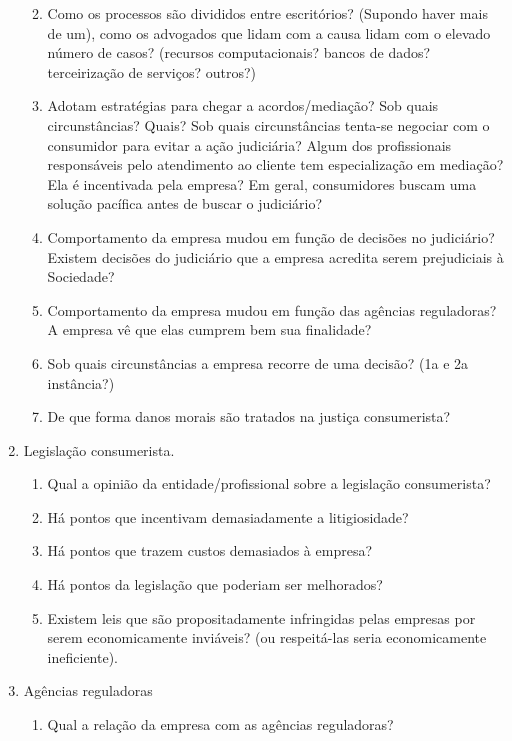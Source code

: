 \documentclass[]{report}
\providecommand{\tightlist}{%
  \setlength{\itemsep}{0pt}\setlength{\parskip}{0pt}}
\begin{document}
\begin{enumerate}
  \begin{enumerate}
  \def\labelenumii{\arabic{enumii}.}
  \tightlist
  \item
    Como os processos são divididos entre escritórios? (Supondo haver
    mais de um), como os advogados que lidam com a causa lidam com o
    elevado número de casos? (recursos computacionais? bancos de dados?
    terceirização de serviços? outros?)
  \item
    Adotam estratégias para chegar a acordos/mediação? Sob quais
    circunstâncias? Quais? Sob quais circunstâncias tenta-se negociar
    com o consumidor para evitar a ação judiciária? Algum dos
    profissionais responsáveis pelo atendimento ao cliente tem
    especialização em mediação? Ela é incentivada pela empresa? Em
    geral, consumidores buscam uma solução pacífica antes de buscar o
    judiciário?
  \item
    Comportamento da empresa mudou em função de decisões no judiciário?
    Existem decisões do judiciário que a empresa acredita serem
    prejudiciais à Sociedade?
  \item
    Comportamento da empresa mudou em função das agências reguladoras? A
    empresa vê que elas cumprem bem sua finalidade?
  \item
    Sob quais circunstâncias a empresa recorre de uma decisão? (1a e 2a
    instância?)
  \item
    De que forma danos morais são tratados na justiça consumerista?
  \end{enumerate}
\item
  Legislação consumerista.

  \begin{enumerate}
  \def\labelenumii{\arabic{enumii}.}
  \tightlist
  \item
    Qual a opinião da entidade/profissional sobre a legislação
    consumerista?
  \item
    Há pontos que incentivam demasiadamente a litigiosidade?
  \item
    Há pontos que trazem custos demasiados à empresa?
  \item
    Há pontos da legislação que poderiam ser melhorados?
  \item
    Existem leis que são propositadamente infringidas pelas empresas por
    serem economicamente inviáveis? (ou respeitá-las seria
    economicamente ineficiente).
  \end{enumerate}
\item
  Agências reguladoras

  \begin{enumerate}
  \def\labelenumii{\arabic{enumii}.}
  \tightlist
  \item
    Qual a relação da empresa com as agências reguladoras?
  \end{enumerate}
\end{enumerate}
\end{document}
